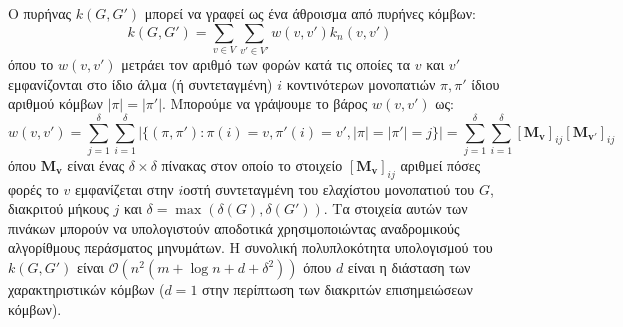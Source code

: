 Ο πυρήνας $k(G,G')$ μπορεί να γραφεί ως ένα άθροισμα από πυρήνες κόμβων:
\begin{equation}
    k(G,G') = \sum_{v \in V} \sum_{v' \in V'} w(v,v') k_n(v, v')
\end{equation}
όπου το $w(v,v')$ μετράει τον αριθμό των φορών κατά τις οποίες τα $v$ και $v'$ εμφανίζονται στο ίδιο άλμα (ή συντεταγμένη) $i$ κοντινότερων μονοπατιών $\pi,\pi'$ ίδιου αριθμού κόμβων $|\pi| = |\pi'|$.
Μπορούμε να γράψουμε το βάρος $w(v,v')$ ως:
\begin{equation}
    w(v,v') = \sum_{j=1}^\delta \sum_{i=1}^\delta | \{ (\pi,\pi') : \pi(i)=v, \pi'(i)=v', |\pi|=|\pi'|=j \} | = \sum_{j=1}^\delta \sum_{i=1}^\delta [\mathbf{M_v}]_{ij} [\mathbf{M_{v'}}]_{ij}
\end{equation}
όπου $\mathbf{M_v}$ είναι ένας $\delta \times \delta$ πίνακας στον οποίο το στοιχείο $[\mathbf{M_v}]_{ij}$ αριθμεί πόσες φορές το $v$ εμφανίζεται στην $i$οστή συντεταγμένη του ελαχίστου μονοπατιού του $G$, διακριτού μήκους $j$ και $\delta = \max(\delta(G), \delta(G'))$.
Τα στοιχεία αυτών των πινάκων μπορούν να υπολογιστούν αποδοτικά χρησιμοποιώντας αναδρομικούς αλγορίθμους περάσματος μηνυμάτων. 
Η συνολική πολυπλοκότητα υπολογισμού του $k(G,G')$ είναι $\mathcal{O}(n^2(m + \log n + d + \delta^2))$ όπου $d$ είναι η διάσταση των χαρακτηριστικών κόμβων ($d=1$ στην περίπτωση των διακριτών επισημειώσεων κόμβων).

